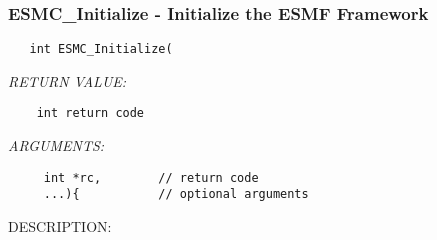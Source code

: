 
\setlength{\oldparskip}{\parskip}
\setlength{\parskip}{1.5ex}
\setlength{\oldparindent}{\parindent}
\setlength{\parindent}{0pt}
\setlength{\oldbaselineskip}{\baselineskip}
\setlength{\baselineskip}{11pt}
 
\def\bv{\begin{verbatim}}
\def\ev{\end{verbatim}}
\def\be{\begin{equation}}
\def\ee{\end{equation}}
\def\bea{\begin{eqnarray}}
\def\eea{\end{eqnarray}}
\def\bi{\begin{itemize}}
\def\ei{\end{itemize}}
\def\bn{\begin{enumerate}}
\def\en{\end{enumerate}}
\def\bd{\begin{description}}
\def\ed{\end{description}}
\def\({\left (}
\def\){\right )}
\def\[{\left [}
\def\]{\right ]}
\def\<{\left  \langle}
\def\>{\right \rangle}
\def\cI{{\cal I}}
\def\diag{\mathop{\rm diag}}
\def\tr{\mathop{\rm tr}}


 
\subsubsection [ESMC\_Initialize] {ESMC\_Initialize - Initialize the ESMF Framework}


  
\begin{verbatim}   int ESMC_Initialize(\end{verbatim}{\em RETURN VALUE:}
\begin{verbatim}    int return code\end{verbatim}{\em ARGUMENTS:}
\begin{verbatim}     int *rc,        // return code
     ...){           // optional arguments
    \end{verbatim}
{\sf DESCRIPTION:\\ }


